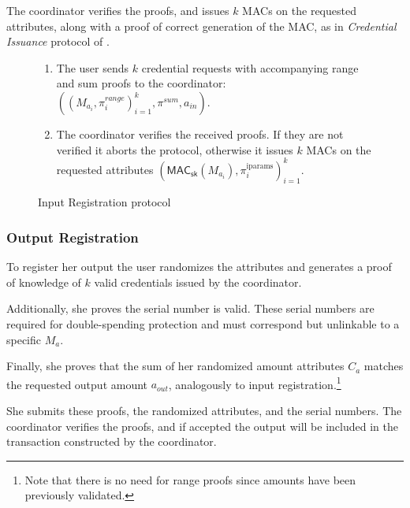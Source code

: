 \documentclass[a4paper]{article}
\begin{document}
The coordinator verifies the proofs, and issues $k$ MACs on the requested attributes, along with a proof of correct generation of the MAC, as in \emph{Credential Issuance} protocol of \cite{chase2019signal}.

\begin{figure}[h!]
    \begin{mdframed}
    \begin{enumerate}
        \item The user sends $k$ credential requests with accompanying range and sum proofs to the coordinator:  $((M_{a_i},\pi^{\textit{range}}_{i})^{k}_{i=1},\pi^{sum},a_{\textit{in}})$.
        \item The coordinator verifies the received proofs. If they are not verified it aborts the protocol, otherwise it issues $k$ MACs on the requested attributes $(\mathsf{MAC}_\mathsf{sk}(M_{a_i}), \pi_i^{\mathrm{iparams}})^{k}_{i=1}$.
    \end{enumerate}

\end{mdframed}
    \caption{Input Registration protocol}
    \label{fig:inputreg}
\end{figure}

\subsubsection{Output Registration}

To register her output the user randomizes the attributes and generates a proof of knowledge of $k$ valid credentials issued by the coordinator.

Additionally, she proves the serial number is valid. These serial numbers are required for double-spending protection and must correspond but unlinkable to a specific $M_a$.

Finally, she proves that the sum of her randomized amount attributes $C_a$ matches the requested output amount $a_{\mathit{out}}$, analogously to input registration.\footnote{Note that there is no need for range proofs since amounts have been previously validated.}

She submits these proofs, the randomized attributes, and the serial numbers. The coordinator verifies the proofs, and if accepted the output will be included in the transaction constructed by the coordinator.
\end{document}
